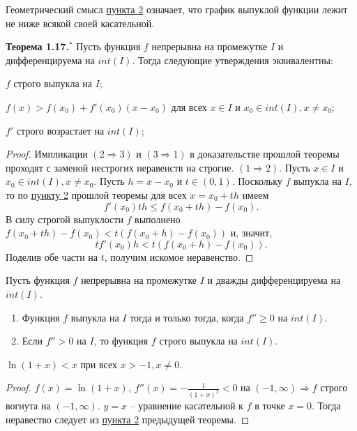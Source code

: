 \begin{note}
    Геометрический смысл \hyperlink{sec_punkt}{пункта 2} означает, что график выпуклой функции лежит не ниже всякой своей касательной.
\end{note}

\textbf{Теорема 1.17.$^{*}$}
Пусть функция $f$ непрерывна на промежутке $I$ и дифференцируема на $int(I)$. Тогда следующие утверждения эквивалентны:
\begin{enumerate}
    \item $f$ строго выпукла на $I$;
    \hypertarget{secsec_punkt}{\item} $f(x) > f(x_{0}) + f'(x_{0})(x-x_{0})$ для всех $x \in I$ и $x_{0} \in int(I), x \neq x_{0}$;
    \item $f'$ строго возрастает на $int(I)$;
\end{enumerate}

\begin{proof}
    Импликации $(2 \Rightarrow 3)$ и $(3 \Rightarrow 1)$ в доказательстве прошлой теоремы проходят с заменой нестрогих неравенств на строгие.
    $(1 \Rightarrow 2)$. Пусть $x \in I$ и $x_{0} \in int(I), x \neq x_{0}$. Пусть $h = x - x_{0}$ и $t \in (0,1)$. Поскольку $f$ выпукла на $I$, то по \hyperlink{sec_punkt}{пункту 2} прошлой теоремы для всех $x = x_{0} + th$ имеем
    \[f'(x_{0})th \leq f(x_{0} + th) - f(x_{0}).\]
    В силу строгой выпуклости $f$ выполнено $f(x_{0} + th) - f(x_{0}) < t(f(x_{0} + h) - f(x_{0}))$ и, значит,
    \[tf'(x_{0})h < t(f(x_{0} + h) - f(x_{0})).\]
    Поделив обе части на $t$, получим искомое неравенство.
\end{proof}

\begin{corollary}
    Пусть функция $f$ непрерывна на промежутке $I$ и дважды дифференцируема на $int(I)$.
    \begin{enumerate}
        \item Функция $f$ выпукла на $I$ тогда и только тогда, когда $f'' \geq 0$ на $int(I)$.
        \item Если $f'' > 0$ на $I$, то функция $f$ строго выпукла на $int(I)$.
    \end{enumerate}
\end{corollary}

\begin{example}
    $\ln(1+x) < x$ при всех $x > -1, x \neq 0$.
\end{example}

\begin{proof}
    $f(x) = \ln(1+x), \  f''(x) = -\frac{1}{(1+x)^{2}} < 0$ на $(-1, \infty) \Rightarrow f$ строго вогнута на $(-1, \infty)$.
    $y = x$ -- уравнение касательной к $f$ в точке $x = 0$. Тогда неравество следует из \hyperlink{secsec_punkt}{пункта 2} предыдущей теоремы.
\end{proof}

